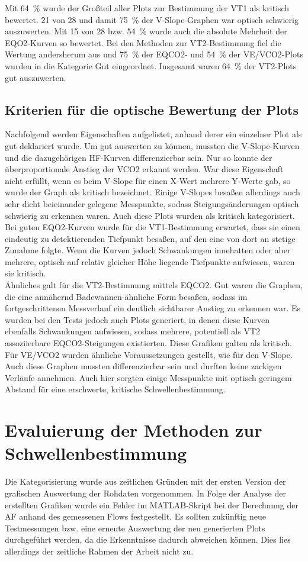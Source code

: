 %
Mit 64~\% wurde der Großteil aller Plots zur Bestimmung der VT1 als kritisch bewertet. 21 von 28 und damit 75~\% der V-Slope-Graphen war optisch schwierig auszuwerten. Mit 15 von 28 bzw. 54~\% wurde auch die absolute Mehrheit der \gls{EQO2}-Kurven so bewertet. Bei den Methoden zur VT2-Bestimmung fiel die Wertung andersherum aus und 75~\% der \gls{EQCO2}- und 54~\% der \gls{VE}/\gls{VCO2}-Plots wurden in die Kategorie Gut eingeordnet. Insgesamt waren 64~\% der VT2-Plots gut auszuwerten.
%
\subsection{Kriterien für die optische Bewertung der Plots}
%
Nachfolgend werden Eigenschaften aufgelistet, anhand derer ein einzelner Plot als gut deklariert wurde. Um gut auswerten zu können, mussten die V-Slope-Kurven und die dazugehörigen \gls{HF}-Kurven differenzierbar sein. Nur so konnte der überproportionale Anstieg der \gls{VCO2} erkannt werden. War diese Eigenschaft nicht erfüllt, wenn es beim V-Slope für einen X-Wert mehrere Y-Werte gab, so wurde der Graph als kritisch bezeichnet. Einige V-Slopes besaßen allerdings auch sehr dicht beieinander gelegene Messpunkte, sodass Steigungsänderungen optisch schwierig zu erkennen waren. Auch diese Plots wurden als kritisch kategorisiert.\\
Bei guten \gls{EQO2}-Kurven wurde für die VT1-Bestimmung erwartet, dass sie einen eindeutig zu detektierenden Tiefpunkt besaßen, auf den eine von dort an stetige Zunahme folgte. Wenn die Kurven jedoch Schwankungen innehatten oder aber mehrere, optisch auf relativ gleicher Höhe liegende Tiefpunkte aufwiesen, waren sie kritisch.\\
Ähnliches galt für die VT2-Bestimmung mittels \gls{EQCO2}. Gut waren die Graphen, die eine annähernd Badewannen-ähnliche Form besaßen, sodass im fortgeschrittenen Messverlauf ein deutlich sichtbarer Anstieg zu erkennen war. Es wurden bei den Tests jedoch auch Plots generiert, in denen diese Kurven ebenfalls Schwankungen aufwiesen, sodass mehrere, potentiell als VT2 assoziierbare \gls{EQCO2}-Steigungen existierten. Diese Grafiken galten als kritisch.\\
Für \gls{VE}/\gls{VCO2} wurden ähnliche Voraussetzungen gestellt, wie für den V-Slope. Auch diese Graphen mussten differenzierbar sein und durften keine zackigen Verläufe annehmen. Auch hier sorgten einige Messpunkte mit optisch geringem Abstand für eine erschwerte, kritische Schwellenbestimmung. 
%
\section{Evaluierung der Methoden zur Schwellenbestimmung}
%
Die Kategorisierung wurde aus zeitlichen Gründen mit der ersten Version der grafischen Auswertung der Rohdaten vorgenommen. In Folge der Analyse der erstellten Grafiken wurde ein Fehler im MATLAB-Skript bei der Berechnung der \gls{AF} anhand des gemessenen Flows festgestellt. Es sollten zukünftig neue Testmessungen bzw. eine erneute Auswertung der neu generierten Plots durchgeführt werden, da die Erkenntnisse dadurch abweichen können. Dies lies allerdings der zeitliche Rahmen der Arbeit nicht zu.
%
